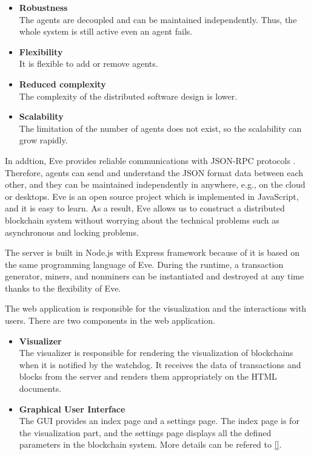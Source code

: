 \begin{itemize}
    \item \textbf{Robustness} \\
        The agents are decoupled and can be maintained independently. Thus, the whole system is still active even an agent fails.
    \item \textbf{Flexibility} \\
        It is flexible to add or remove agents.
    \item \textbf{Reduced complexity} \\
        The complexity of the distributed software design is lower.
    \item \textbf{Scalability} \\
        The limitation of the number of agents does not exist, so the scalability can grow rapidly.
\end{itemize}

In addtion, Eve provides reliable communications with JSON-RPC protocols \cite{jsonrpc}. Therefore, agents can send and understand the JSON format data between each other, and they can be maintained independently in anywhere, e.g., on the cloud or desktops. Eve is an open source project which is implemented in JavaScript, and it is easy to learn. As a result, Eve allows us to construct a distributed blockchain system without worrying about the technical problems such as asynchronous and locking problems.

The server is built in Node.js with Express framework because of it is based on the same programming language of Eve. During the runtime, a transaction generator, miners, and nonminers can be instantiated and destroyed at any time thanks to the flexibility of Eve.

The web application is responsible for the visualization and the interactions with users. There are two components in the web application.

\begin{itemize}
    \item \textbf{Visualizer} \\
        The visualizer is responsible for rendering the visualization of blockchains when it is notified by the watchdog. It receives the data of transactions and blocks from the server and renders them appropriately on the HTML documents.
    \item \textbf{Graphical User Interface} \\
        The GUI provides an index page and a settings page. The index page is for the visualization part, and the settings page displays all the defined parameters in the blockchain system. More details can be refered to \ref{}.
\end{itemize}

